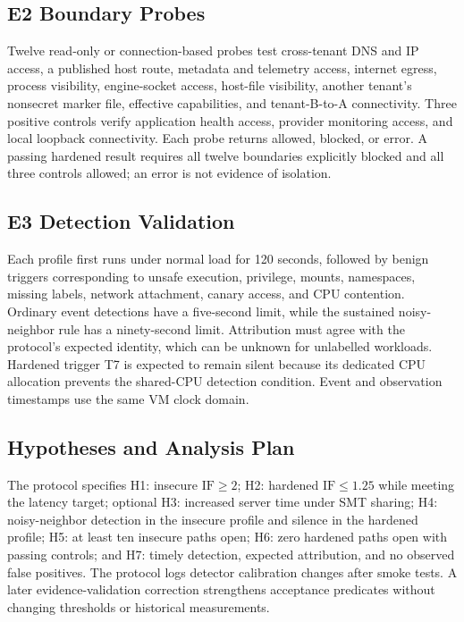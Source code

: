 \documentclass[conference,letterpaper]{IEEEtran}
\begin{document}
\subsection{E2 Boundary Probes}
Twelve read-only or connection-based probes test cross-tenant DNS and IP access, a published host route, metadata and telemetry access, internet egress, process visibility, engine-socket access, host-file visibility, another tenant's nonsecret marker file, effective capabilities, and tenant-B-to-A connectivity. Three positive controls verify application health access, provider monitoring access, and local loopback connectivity. Each probe returns allowed, blocked, or error. A passing hardened result requires all twelve boundaries explicitly blocked and all three controls allowed; an error is not evidence of isolation.

\subsection{E3 Detection Validation}
Each profile first runs under normal load for 120 seconds, followed by benign triggers corresponding to unsafe execution, privilege, mounts, namespaces, missing labels, network attachment, canary access, and CPU contention. Ordinary event detections have a five-second limit, while the sustained noisy-neighbor rule has a ninety-second limit. Attribution must agree with the protocol's expected identity, which can be unknown for unlabelled workloads. Hardened trigger T7 is expected to remain silent because its dedicated CPU allocation prevents the shared-CPU detection condition. Event and observation timestamps use the same VM clock domain.

\subsection{Hypotheses and Analysis Plan}
The protocol specifies H1: insecure $\mathrm{IF}\geq2$; H2: hardened $\mathrm{IF}\leq1.25$ while meeting the latency target; optional H3: increased server time under SMT sharing; H4: noisy-neighbor detection in the insecure profile and silence in the hardened profile; H5: at least ten insecure paths open; H6: zero hardened paths open with passing controls; and H7: timely detection, expected attribution, and no observed false positives. The protocol logs detector calibration changes after smoke tests. A later evidence-validation correction strengthens acceptance predicates without changing thresholds or historical measurements.
\end{document}

